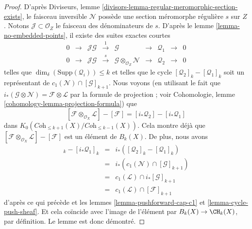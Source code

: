 \begin{proof}
\medskip\noindent
D'après Diviseurs, lemme \ref{divisors-lemma-regular-meromorphic-section-exists},
le faisceau inversible $\mathcal{N}$ possède une section méromorphe régulière $s$
sur $Z$. Notons $\mathcal{J} \subset \mathcal{O}_Z$ le faisceau
des dénominateurs de $s$. D'après le lemme \ref{lemma-no-embedded-points},
il existe des suites exactes courtes
$$
\begin{matrix}
0 &
\to &
\mathcal{J}\mathcal{G} &
\xrightarrow{1} &
\mathcal{G} &
\to &
\mathcal{Q}_1 &
\to &
0 \\
0 &
\to &
\mathcal{J}\mathcal{G} &
\xrightarrow{s} &
\mathcal{G} \otimes_{\mathcal{O}_Z} \mathcal{N} &
\to &
\mathcal{Q}_2 &
\to &
0
\end{matrix}
$$
telles que $\dim_\delta(\text{Supp}(\mathcal{Q}_i)) \leq k$ et
telles que le cycle
$
[\mathcal{Q}_2]_k - [\mathcal{Q}_1]_k
$
soit un représentant de $c_1(\mathcal{N}) \cap [\mathcal{G}]_{k + 1}$.
Nous voyons (en utilisant le fait que
$i_*(\mathcal{G} \otimes \mathcal{N}) = \mathcal{F} \otimes \mathcal{L}$
par la formule de projection ; voir
Cohomologie, lemme \ref{cohomology-lemma-projection-formula})
que
$$
[\mathcal{F} \otimes_{\mathcal{O}_X} \mathcal{L}]
-
[\mathcal{F}]
=
[i_*\mathcal{Q}_2] - [i_*\mathcal{Q}_1]
$$
dans $K_0(\textit{Coh}_{\leq k + 1}(X)/\textit{Coh}_{\leq k - 1}(X))$.
Cela montre déjà que
$[\mathcal{F} \otimes_{\mathcal{O}_X} \mathcal{L}] - [\mathcal{F}]$
est un élément de $B_k(X)$. De plus, nous avons
\begin{eqnarray*}
[i_*\mathcal{Q}_2]_k - [i_*\mathcal{Q}_1]_k
& = &
i_*\left( [\mathcal{Q}_2]_k - [\mathcal{Q}_1]_k \right) \\
& = &
i_*\left(c_1(\mathcal{N}) \cap [\mathcal{G}]_{k + 1} \right) \\
& = &
c_1(\mathcal{L}) \cap i_*[\mathcal{G}]_{k + 1} \\
& = &
c_1(\mathcal{L}) \cap [\mathcal{F}]_{k + 1}
\end{eqnarray*}
d'après ce qui précède et les lemmes \ref{lemma-pushforward-cap-c1}
et \ref{lemma-cycle-push-sheaf}. Et cela coïncide avec
l'image de l'élément par $B_k(X) \to \CH_k(X)$, par définition.
Le lemme est donc démontré.
\end{proof}








































